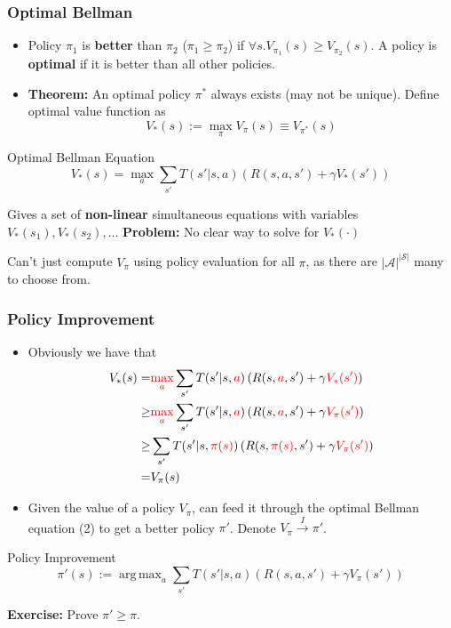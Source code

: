 \documentclass[10pt,a4paper]{beamer}
\renewcommand{\S}{\mathcal{S}}
\newcommand{\A}{\mathcal{A}}
\DeclareMathOperator*{\argmax}{arg\,max}
\newcommand{\red}[1]{\textcolor{red}{#1}}
\begin{document}
\begin{frame}
	\frametitle{Optimal Bellman}
	\begin{itemize}
		\item Policy $\pi_1$ is \textbf{better} than $\pi_2$ ($\pi_1 \geq \pi_2$)
		if $\forall s. V_{\pi_1}(s) \geq V_{\pi_2}(s)$. A policy is \textbf{optimal}
		if it is better than all other policies. 
		\pause
		\item \textbf{Theorem:} An optimal policy $\pi^*$ always exists (may not be unique). 
		Define optimal value function as 
		$$
		V_*(s) := \max_{\pi} V_{\pi}(s) \equiv V_{\pi^*}(s)
		$$
		\pause
	\end{itemize}

\begin{block}{Optimal Bellman Equation}
	$$
	V_*(s) = \max_a \sum_{s'} T(s' | s, a) \left( R(s,a,s') + \gamma V_*(s') \right)
	$$
\end{block}
Gives a set of \textbf{non-linear} simultaneous equations with variables
$ V_*(s_1),  V_*(s_2), \ldots$
\textbf{Problem:} No clear way to solve for $V_*(\cdot)$

Can't just compute $V_\pi$ using policy evaluation for all $\pi$, as
there are $|\A|^{|\S|}$ many to choose from.

\end{frame}

\begin{frame}
	\frametitle{Policy Improvement}
	\begin{itemize}
		\item Obviously we have that
		\begin{align}
		V_*(s) = & \red{\max_a} \sum_{s'} T(s' | s, \red{a}) \left( R(s,\red{a},s') + \gamma \red{V_*(s')} \right) \\
		\geq 
		& \red{\max_a} \sum_{s'} T(s' | s, \red{a}) \left( R(s,\red{a},s') + \gamma \red{ V_{\pi}(s') } \right) \\
		\geq & \sum_{s'} T(s' | s, \red{\pi(s)}) \left( R(s,\red{\pi(s)},s') + \gamma \red{V_\pi(s')} \right) \\
         = & V_\pi(s)
		\end{align}
		\pause
		
		\item Given the value of a policy $V_\pi$, can feed it through the optimal Bellman
		equation (2) to get a better policy $\pi'$. Denote $V_\pi \overset{I}{\rightarrow} \pi'$.
	\end{itemize}
\pause
\begin{block}{Policy Improvement}
$$
\pi'(s) := \argmax_a \sum_{s'} T(s' | s,a) 
\left( R(s,a,s') + \gamma V_{\pi}(s') \right)
$$
\end{block}
\textbf{Exercise:} Prove $\pi' \geq \pi$.
\end{frame}
\end{document}
